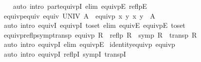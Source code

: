 \begin{isabellebody}
%
\isadelimproof
\ \ %
\endisadelimproof
%
\isatagproof
{}\isamarkupfalse%
\ {\isacharparenleft}{\kern0pt}auto\ intro{\isacharcolon}{\kern0pt}\ part{\isacharunderscore}{\kern0pt}equivpI\ elim{\isacharcolon}{\kern0pt}\ equivpE\ reflpE{\isacharparenright}{\kern0pt}%
\endisatagproof
{\isafoldproof}%
%
\isadelimproof
\isanewline
%
\endisadelimproof
\isanewline
{}\isamarkupfalse%
\ equivp{\isacharunderscore}{\kern0pt}equiv{\isacharcolon}{\kern0pt}\ {\isachardoublequoteopen}equiv\ UNIV\ A\ {\isasymlongleftrightarrow}\ equivp\ {\isacharparenleft}{\kern0pt}{\isasymlambda}x\ y{\isachardot}{\kern0pt}\ {\isacharparenleft}{\kern0pt}x{\isacharcomma}{\kern0pt}\ y{\isacharparenright}{\kern0pt}\ {\isasymin}\ A{\isacharparenright}{\kern0pt}{\isachardoublequoteclose}\isanewline
%
\isadelimproof
\ \ %
\endisadelimproof
%
\isatagproof
{}\isamarkupfalse%
\ {\isacharparenleft}{\kern0pt}auto\ intro{\isacharbang}{\kern0pt}{\isacharcolon}{\kern0pt}\ equivI\ equivpI\ {\isacharbrackleft}{\kern0pt}to{\isacharunderscore}{\kern0pt}set{\isacharbrackright}{\kern0pt}\ elim{\isacharbang}{\kern0pt}{\isacharcolon}{\kern0pt}\ equivE\ equivpE\ {\isacharbrackleft}{\kern0pt}to{\isacharunderscore}{\kern0pt}set{\isacharbrackright}{\kern0pt}{\isacharparenright}{\kern0pt}%
\endisatagproof
{\isafoldproof}%
%
\isadelimproof
\isanewline
%
\endisadelimproof
\isanewline
{}\isamarkupfalse%
\ equivp{\isacharunderscore}{\kern0pt}reflp{\isacharunderscore}{\kern0pt}symp{\isacharunderscore}{\kern0pt}transp{\isacharcolon}{\kern0pt}\ {\isachardoublequoteopen}equivp\ R\ {\isasymlongleftrightarrow}\ reflp\ R\ {\isasymand}\ symp\ R\ {\isasymand}\ transp\ R{\isachardoublequoteclose}\isanewline
%
\isadelimproof
\ \ %
\endisadelimproof
%
\isatagproof
{}\isamarkupfalse%
\ {\isacharparenleft}{\kern0pt}auto\ intro{\isacharcolon}{\kern0pt}\ equivpI\ elim{\isacharcolon}{\kern0pt}\ equivpE{\isacharparenright}{\kern0pt}%
\endisatagproof
{\isafoldproof}%
%
\isadelimproof
\isanewline
%
\endisadelimproof
\isanewline
{}\isamarkupfalse%
\ identity{\isacharunderscore}{\kern0pt}equivp{\isacharcolon}{\kern0pt}\ {\isachardoublequoteopen}equivp\ {\isacharparenleft}{\kern0pt}{\isacharequal}{\kern0pt}{\isacharparenright}{\kern0pt}{\isachardoublequoteclose}\isanewline
%
\isadelimproof
\ \ %
\endisadelimproof
%
\isatagproof
{}\isamarkupfalse%
\ {\isacharparenleft}{\kern0pt}auto\ intro{\isacharcolon}{\kern0pt}\ equivpI\ reflpI\ sympI\ transpI{\isacharparenright}{\kern0pt}%
\endisatagproof
{\isafoldproof}%
%
\isadelimproof
\isanewline
%
\endisadelimproof

\end{isabellebody}

